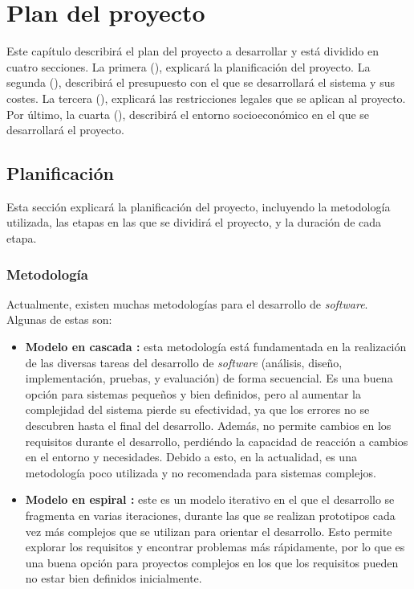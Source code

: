 \chapter{Plan del proyecto}\label{chap:planning}

Este capítulo describirá el plan del proyecto a desarrollar y está
dividido en cuatro secciones. La primera (), explicará la
planificación del proyecto. La segunda (), describirá el
presupuesto con el que se desarrollará el sistema y sus costes. La tercera
(), explicará las restricciones legales que se aplican al
proyecto. Por último, la cuarta (), describirá el
entorno socioeconómico en el que se desarrollará el proyecto.

\newcommand{\componentref}[1]{\hyperref[req:#1]{`#1'}}

\section{Planificación}\label{sec:plan}

Esta sección explicará la planificación del proyecto, incluyendo la metodología
utilizada, las etapas en las que se dividirá el proyecto, y la duración de cada
etapa.

\subsection{Metodología}

Actualmente, existen muchas metodologías para el desarrollo de \textit{software}.
Algunas de estas son:

\begin{itemize}
    \item \textbf{Modelo en cascada \parencite{waterfall-model}:} esta
    metodología está fundamentada en la realización de las diversas tareas del
    desarrollo de \textit{software} (análisis, diseño, implementación, pruebas,
    y evaluación) de forma secuencial. Es una buena opción para sistemas
    pequeños y bien definidos, pero al aumentar la complejidad del sistema
    pierde su efectividad, ya que los errores no se descubren hasta el final del
    desarrollo. Además, no permite cambios en los requisitos durante el
    desarrollo, perdiéndo la capacidad de reacción a cambios en el entorno y
    necesidades. Debido a esto, en la actualidad, es una metodología poco
    utilizada y no recomendada para sistemas complejos.
    \item \textbf{Modelo en espiral \parencite{spiral-model}:} este es un modelo
    iterativo en el que el desarrollo se fragmenta en varias iteraciones, durante
    las que se realizan prototipos cada vez más complejos que se utilizan
    para orientar el desarrollo. Esto permite explorar los requisitos y
    encontrar problemas más rápidamente, por lo que es una buena opción para
    proyectos complejos en los que los requisitos pueden no estar bien definidos
    inicialmente.
\end{itemize}

